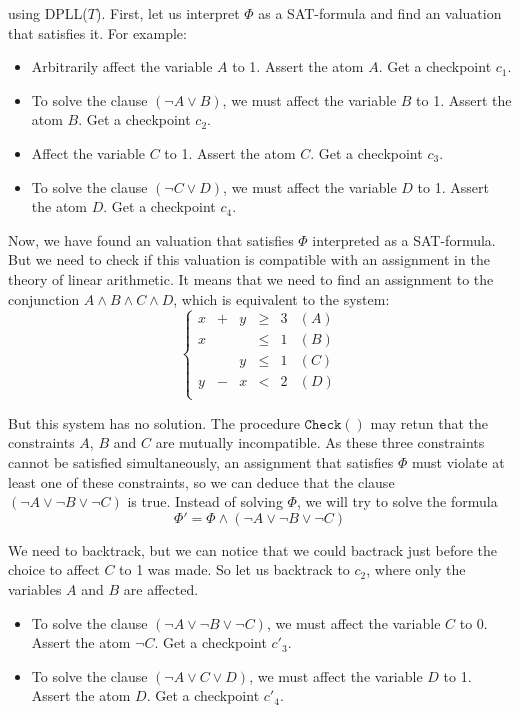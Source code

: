 \documentclass{article}
\newcommand{\icheck}{\mathtt{Check}()}
\begin{document}
using DPLL($T$). First, let us interpret $\Phi$ as a SAT-formula and find an
valuation that satisfies it. For example:
\begin{itemize}
  \item Arbitrarily affect the variable $A$ to 1. Assert the atom $A$. Get a
    checkpoint $c_1$.
  \item To solve the clause $(\neg A \vee B)$, we must affect the variable $B$
    to 1. Assert the atom $B$. Get a checkpoint $c_2$.
  \item Affect the variable $C$ to 1. Assert the atom $C$. Get a checkpoint
    $c_3$.
  \item To solve the clause $(\neg C \vee D)$, we must affect the variable $D$
    to 1. Assert the atom $D$. Get a checkpoint $c_4$.
\end{itemize}

Now, we have found an valuation that satisfies $\Phi$ interpreted as a
SAT-formula. But we need to check if this valuation is compatible with an
assignment in the theory of linear arithmetic. It means that we need to find an
assignment to the conjunction $A \wedge B \wedge C \wedge D$, which is equivalent
to the system:
\begin{displaymath}
  \left\{
  \begin{array}{cccccc}
    x  & + & y & \geqslant & 3 & (A) \\
    x  &   &   & \leqslant & 1 & (B) \\
       &   & y & \leqslant & 1 & (C) \\
    y  & - & x & <         & 2 & (D) \\
  \end{array}
  \right.
\end{displaymath}

But this system has no solution. The procedure $\icheck$ may retun that the
constraints $A$, $B$ and $C$ are mutually incompatible. As these three
constraints cannot be satisfied simultaneously, an assignment that satisfies
$\Phi$ must violate at least one of these constraints, so we can deduce that
the clause $(\neg A \vee \neg B \vee \neg C)$ is true. Instead of solving
$\Phi$, we will try to solve the formula
$$\Phi' = \Phi \wedge (\neg A \vee \neg B \vee \neg C)$$

We need to backtrack, but we can notice that we could bactrack just before
the choice to affect $C$ to 1 was made. So let us backtrack to $c_2$, where
only the variables $A$ and $B$ are affected.

\begin{itemize}
  \item To solve the clause $(\neg A \vee \neg B \vee \neg C)$, we must affect
    the variable $C$ to 0. Assert the atom $\neg C$. Get a checkpoint $c'_3$.
  \item To solve the clause $(\neg A \vee C \vee D)$, we must affect the
    variable $D$ to 1. Assert the atom $D$. Get a checkpoint $c'_4$.
\end{itemize}
\end{document}
